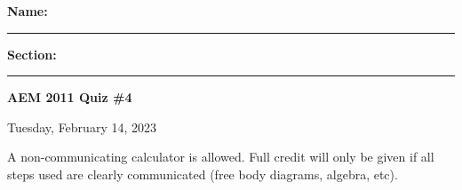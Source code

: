 \documentclass{article}
\begin{document}

\vspace{.5cm}
\noindent
\textbf{Name: }\rule{5cm}{0.4pt}\hspace{.5cm}
\textbf{Section: }\rule{1cm}{0.4pt}
\hfill\textbf{AEM 2011 Quiz \#4}

\noindent
\hfill Tuesday, February 14, 2023
\vspace{1cm}
\noindent

\vspace{.3cm}

\noindent A non-communicating calculator is allowed.  Full credit will only be given if all steps used are clearly communicated (free body diagrams, algebra, etc).

\vspace{0.5cm}




\end{document}
